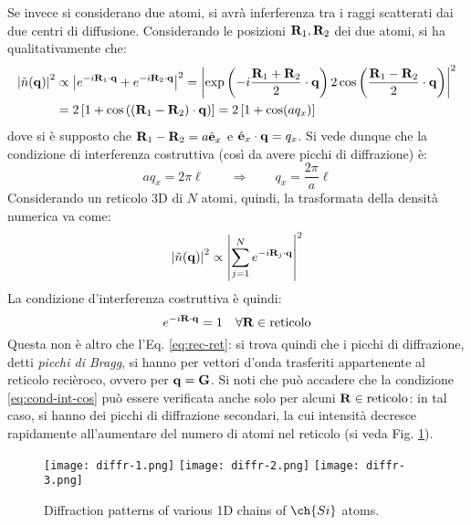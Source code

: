 Se invece si considerano due atomi, si avrà inferferenza tra i raggi scatterati dai due centri di diffusione. Considerando le posizioni $ \mathbf{R}_1 , \mathbf{R}_2 $ dei due atomi, si ha qualitativamente che:
\begin{equation*}
	\begin{split}
		\left\lvert\tilde{n}(\mathbf{q})\right\rvert^2
		& \propto \left\lvert e^{-i \mathbf{R}_1 \cdot \mathbf{q}} + e^{-i \mathbf{R}_2 \cdot \mathbf{q}}\right\rvert^2 = \left\lvert\exp \left( -i \frac{\mathbf{R}_1 + \mathbf{R}_2}{2} \cdot \mathbf{q} \right) 2 \cos \left( \frac{\mathbf{R}_1 - \mathbf{R}_2}{2} \cdot \mathbf{q} \right)\right\rvert^2 \\
		& = 2 \left[ 1 + \cos \left( (\mathbf{R}_1 - \mathbf{R}_2) \cdot \mathbf{q} \right) \right] = 2 \left[ 1 + \cos (a q_x) \right]
	\end{split}
\end{equation*}
dove si è supposto che $ \mathbf{R}_1 - \mathbf{R}_2 = a \hat{\mathbf{e}}_x $ e $ \hat{\mathbf{e}}_x \cdot \mathbf{q} = q_x $. Si vede dunque che la condizione di interferenza costruttiva (così da avere picchi di diffrazione) è:
\begin{equation*}
	aq_x = 2\pi \ell
	\qquad \Rightarrow \qquad
	q_x = \frac{2\pi}{a} \ell
\end{equation*}
Considerando un reticolo 3D di $ N $ atomi, quindi, la trasformata della densità numerica va come:
\begin{equation*}
\left\lvert\tilde{n}(\mathbf{q})\right\rvert^2 \propto \left\lvert\sum_{j = 1}^N e^{-i \mathbf{R}_j \cdot \mathbf{q}}\right\rvert^2
\end{equation*}
La condizione d'interferenza costruttiva è quindi:
\begin{equation}
	e^{-i \mathbf{R} \cdot \mathbf{q}} = 1 \quad \forall \mathbf{R} \in \text{reticolo}
	\label{eq:cond-int-cos}
\end{equation}
Questa non è altro che l'Eq. \ref{eq:rec-ret}: si trova quindi che i picchi di diffrazione, detti \textit{picchi di Bragg}, si hanno per vettori d'onda trasferiti appartenente al reticolo recièroco, ovvero per $ \mathbf{q} = \mathbf{G} $. Si noti che può accadere che la condizione \ref{eq:cond-int-cos} può essere verificata anche solo per alcuni $ \mathbf{R} \in \text{reticolo} $: in tal caso, si hanno dei picchi di diffrazione secondari, la cui intensità decresce rapidamente all'aumentare del numero di atomi nel reticolo (si veda Fig. \ref{diffr}).

\begin{figure}
	\centering
	\texttt{[image: diffr-1.png]}
	\texttt{[image: diffr-2.png]}
	\texttt{[image: diffr-3.png]}
	\caption{Diffraction patterns of various 1D chains of $ \ch{Si} $ atoms.}
	\label{diffr}
\end{figure}

